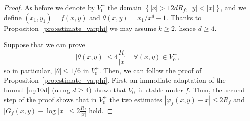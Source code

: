 \documentclass[oneside, 12pt]{amsart}
\newcommand{\set}[1]{\left\{#1\right\}}
\newcommand{\abs}[1]{\left\vert#1\right\vert}
\theoremstyle{plain}
\theoremstyle{definition}
\numberwithin{equation}{section}       %
\numberwithin{equation}{section}       %
\begin{document}
\begin{proof}
As before we denote by $V_0^+$ the domain 
 $\set{\abs{x}>12d R_f, \ \abs{y}<\abs{x}}$, and we  
define $ (x_1, y_1) = f(x,y)  $ and  $  \theta(x,y) =  {x_1}/{x^d} - 1$. 
Thanks to  Proposition~\ref{pro:estimate_varphi} we may 
 assume $k\geq 2$, hence  $d\geq 4$.

Suppose that we can prove 
\begin{equation}
\label{eq:upper_bound_on_theta_composition}
\abs{  \theta(x,y)}\leq 4\frac{R_f}{\abs{x}} \quad \forall (x,y)\in V_0^+,
\end{equation}
so in particular, $\abs{\theta}\leq 1/6$  in $V_0^+$. Then, we can  follow the proof of Proposition~\ref{pro:estimate_varphi}.
First, an immediate adaptation of the bound~\eqref{eq:10d} (using $d\geq 4$)
shows that  $V_0^+$  is stable under $f$. 
Then, the second step of the proof shows that in $V_0^+$  the two estimates
$\abs{\varphi_f(x,y) - x}\leq 2   {R_f}$ and $\abs{G_f(x,y)   - \log\abs{x}}\leq 2 \frac{R_f}{\abs{x}}$
hold.


\end{proof}
\end{document}
